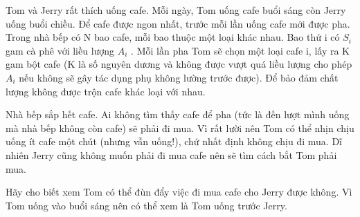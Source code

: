 Tom và Jerry rất thích uống cafe. Mỗi ngày, Tom uống cafe buổi sáng còn Jerry uống buổi chiều. Để cafe được ngon nhất, trước mỗi lần uống cafe mới được pha. Trong nhà bếp có N bao cafe, mỗi bao thuộc một loại khác nhau. Bao thứ i có $S_{i}$ gam cà phê với liều lượng $A_{i}$ . Mỗi lần pha Tom sẽ chọn một loại cafe i, lấy ra K gam bột cafe (K là số nguyên dương và không được vượt quá liều lượng cho phép $A_{i}$ nếu không sẽ gây tác dụng phụ không lường trước được). Để bảo đảm chất lượng không được trộn cafe khác loại với nhau.

Nhà bếp sắp hết cafe. Ai không tìm thấy cafe để pha (tức là đến lượt mình uống mà nhà bếp không còn cafe) sẽ phải đi mua. Vì rất lười nên Tom có thể nhịn chịu uống ít cafe một chút (nhưng vẫn uống!), chứ nhất định không chịu đi mua. Dĩ nhiên Jerry cũng không muốn phải đi mua cafe nên sẽ tìm cách bắt Tom phải mua.

Hãy cho biết xem Tom có thể đùn đẩy việc đi mua cafe cho Jerry được không. Vì Tom uống vào buổi sáng nên có thể xem là Tom uống trước Jerry.